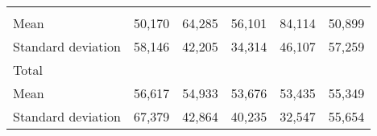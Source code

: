 \begin{tabular}{llllll}
  \multicolumn{1}{|r}{} &
  \multicolumn{1}{r}{} &
  \multicolumn{1}{r}{} &
  \multicolumn{1}{r}{} &
  \multicolumn{1}{r}{} \\
\multicolumn{1}{l}{\hspace{4em}Mean} &
  \multicolumn{1}{|r}{50,170} &
  \multicolumn{1}{r}{64,285} &
  \multicolumn{1}{r}{56,101} &
  \multicolumn{1}{r}{84,114} &
  \multicolumn{1}{r}{50,899} \\
\multicolumn{1}{l}{\hspace{4em}Standard deviation} &
  \multicolumn{1}{|r}{58,146} &
  \multicolumn{1}{r}{42,205} &
  \multicolumn{1}{r}{34,314} &
  \multicolumn{1}{r}{46,107} &
  \multicolumn{1}{r}{57,259} \\
\multicolumn{1}{l}{\hspace{3em}Total} &
  \multicolumn{1}{|r}{} &
  \multicolumn{1}{r}{} &
  \multicolumn{1}{r}{} &
  \multicolumn{1}{r}{} &
  \multicolumn{1}{r}{} \\
\multicolumn{1}{l}{\hspace{4em}Mean} &
  \multicolumn{1}{|r}{56,617} &
  \multicolumn{1}{r}{54,933} &
  \multicolumn{1}{r}{53,676} &
  \multicolumn{1}{r}{53,435} &
  \multicolumn{1}{r}{55,349} \\
\multicolumn{1}{l}{\hspace{4em}Standard deviation} &
  \multicolumn{1}{|r}{67,379} &
  \multicolumn{1}{r}{42,864} &
  \multicolumn{1}{r}{40,235} &
  \multicolumn{1}{r}{32,547} &
  \multicolumn{1}{r}{55,654} \\
\cline{1-6}
\end{tabular}

